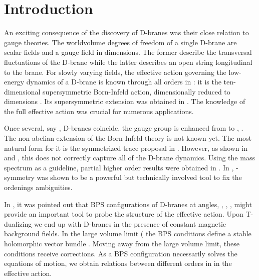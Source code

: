 \documentclass[a4paper,12pt,oneside]{article}
\begin{document}
\section{Introduction}
An exciting consequence of the discovery of D-branes \cite{pol} was their
close relation to gauge theories. The worldvolume
degrees of freedom of a single D\coordHE{}-brane are \coordHE{} scalar fields and a
\coordHE{} gauge field in \coordHE{} dimensions. The former describe the
transversal fluctuations of the D-brane while the latter describes an
open string longitudinal to the brane. For slowly varying fields, the
effective action governing the low-energy dynamics of a D-brane is known
through all orders in \coordHE{}: it is the ten-dimensional
supersymmetric Born-Infeld action, dimensionally reduced to \coordHE{}
dimensions \cite{BI}. Its supersymmetric extension was obtained in
\cite{susynbi}. The knowledge of the full effective action was crucial
for numerous applications.

Once several, say \coordHE{}, D-branes coincide, the gauge group is enhanced
from \coordHE{} to \coordHE{}, \cite{witten}. The non-abelian extension of the
Born-Infeld theory is not known yet. The most natural form for it is the
symmetrized trace proposal in \cite{Tstr}. However, as shown in \cite{HT}
and \cite{DST}, this does not correctly capture all of the D-brane
dynamics. Using the mass spectrum as a guideline, partial higher order
results were obtained in \cite{STT}. In \cite{kappa}, \myHighlight{$\kappa$}\coordHE{}-symmetry
was shown to be a powerful but technically involved tool to fix the
ordenings ambiguities.

In \cite{DST}, it was pointed out that BPS configurations of D\coordHE{}-branes
at angles, \cite{Angles1}, \cite{Angles2}, \cite{townsend},
might provide an important
tool to probe the structure of the effective action. Upon T-dualizing we
end up with D\coordHE{}-branes in the presence of constant magnetic background
fields. In the large volume limit (\coordHE{} the BPS
conditions define a stable holomorphic vector bundle \cite{GSW}.
Moving away from the large volume limit, these conditions receive \coordHE{} corrections. As a BPS configuration necessarily solves the equations
of motion, we obtain relations between different orders in \coordHE{} in
the effective action.
\end{document}
